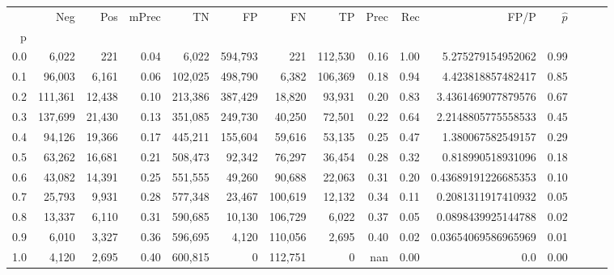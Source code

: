 \begin{tabular}{rrrrrrrrrrrrrrr}
\toprule
{} &      Neg &     Pos & mPrec &       TN &       FP &       FN &       TP &  Prec &   Rec &                 FP/P & $\hat{p}$ \\
p   &          &         &       &          &          &          &          &       &       &                      &           \\
\midrule
0.0 &    6,022 &     221 &  0.04 &    6,022 &  594,793 &      221 &  112,530 &  0.16 &  1.00 &    5.275279154952062 &      0.99 \\
0.1 &   96,003 &   6,161 &  0.06 &  102,025 &  498,790 &    6,382 &  106,369 &  0.18 &  0.94 &    4.423818857482417 &      0.85 \\
0.2 &  111,361 &  12,438 &  0.10 &  213,386 &  387,429 &   18,820 &   93,931 &  0.20 &  0.83 &   3.4361469077879576 &      0.67 \\
0.3 &  137,699 &  21,430 &  0.13 &  351,085 &  249,730 &   40,250 &   72,501 &  0.22 &  0.64 &   2.2148805775558533 &      0.45 \\
0.4 &   94,126 &  19,366 &  0.17 &  445,211 &  155,604 &   59,616 &   53,135 &  0.25 &  0.47 &    1.380067582549157 &      0.29 \\
0.5 &   63,262 &  16,681 &  0.21 &  508,473 &   92,342 &   76,297 &   36,454 &  0.28 &  0.32 &    0.818990518931096 &      0.18 \\
0.6 &   43,082 &  14,391 &  0.25 &  551,555 &   49,260 &   90,688 &   22,063 &  0.31 &  0.20 &  0.43689191226685353 &      0.10 \\
0.7 &   25,793 &   9,931 &  0.28 &  577,348 &   23,467 &  100,619 &   12,132 &  0.34 &  0.11 &   0.2081311917410932 &      0.05 \\
0.8 &   13,337 &   6,110 &  0.31 &  590,685 &   10,130 &  106,729 &    6,022 &  0.37 &  0.05 &   0.0898439925144788 &      0.02 \\
0.9 &    6,010 &   3,327 &  0.36 &  596,695 &    4,120 &  110,056 &    2,695 &  0.40 &  0.02 &  0.03654069586965969 &      0.01 \\
1.0 &    4,120 &   2,695 &  0.40 &  600,815 &        0 &  112,751 &        0 &   nan &  0.00 &                  0.0 &      0.00 \\
\bottomrule
\end{tabular}
